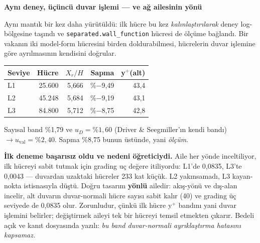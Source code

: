 \documentclass[11pt,a4paper]{article}
\newcommand{\kkkenar}{lacivert}
\newcommand{\kkzemin}{kod}
\newenvironment{renkkutu}[3]{%
  \renewcommand{\kkkenar}{#1}\renewcommand{\kkzemin}{#2}%
  \par\medskip\noindent
  \begin{lrbox}{\kutugovde}%
  \begin{minipage}{\dimexpr\linewidth-2\fboxsep-2\fboxrule\relax}\footnotesize
  \textcolor{#1}{\textbf{#3}}\par\vspace{3pt}%
}{%
  \end{minipage}%
  \end{lrbox}%
  \noindent\fcolorbox{\kkkenar}{\kkzemin}{\usebox{\kutugovde}}%
  \par\medskip
}
\newenvironment{olculdu}[1]{\begin{renkkutu}{iyi}{iyibg}{#1}}{\end{renkkutu}}
\begin{document}
\begin{olculdu}{Aynı deney, üçüncü duvar işlemi --- ve ağ ailesinin yönü}
Aynı mantık bir kez daha yürütüldü: ilk hücre bu kez \emph{kalınlaştırılarak}
deney log-bölgesine taşındı ve \texttt{separated.wall\_function} hücresi de
ölçüme bağlandı. Bir vakanın iki model-form hücresini birden doldurabilmesi,
hücrelerin duvar işlemine göre ayrılmasının kendisini doğrular.

\begin{center}\footnotesize
\begin{tabular}{@{}lrrrr@{}}
\toprule
\textbf{Seviye} & \textbf{Hücre} & \textbf{$X_r/H$} & \textbf{Sapma} & \textbf{y$^+$(alt)} \\
\midrule
L1 & 25.600 & 5{,}666 & \%$-$9{,}49 & 43{,}4 \\
L2 & 45.248 & 5{,}684 & \%$-$9{,}19 & 43{,}1 \\
L3 & 84.800 & 5{,}712 & \%$-$8{,}75 & 42{,}8 \\
\bottomrule
\end{tabular}
\end{center}

\noindent Sayısal band \%1{,}79 ve $u_D=\%1{,}60$ (Driver \& Seegmiller'ın
kendi bandı) $\rightarrow u_{\mathrm{val}}=\%2{,}40$. Sapma \%8{,}75 bunun
üstünde, yani \emph{ölçüm}.

\textbf{İlk deneme başarısız oldu ve nedeni öğreticiydi.} Aile her yönde
inceltiliyor, ilk hücreyi sabit tutmak için grading uç değere itiliyordu:
L1'de 0{,}0835, L3'te 0{,}0043 --- duvardan uzaktaki hücreler 233 kat küçük.
L2 yakınsamadı, L3 kayan-nokta istisnasıyla düştü. Doğru tasarım
\textbf{yönlü} ailedir: akış-yönü ve dış-alan incelir, alt duvarın
duvar-normali hücre sayısı sabit kalır (40) ve grading üç seviyede de 0{,}0835
olur. Zorunludur, çünkü ilk hücre y$^+$ bandını yani duvar işlemini belirler;
değiştirmek aileyi tek bir hücreyi temsil etmekten çıkarır. Bedeli açık ve
kanıt dosyasında yazılı: \emph{bu band duvar-normali ayrıklaştırma hatasını
kapsamaz.}
\end{olculdu}
\end{document}

